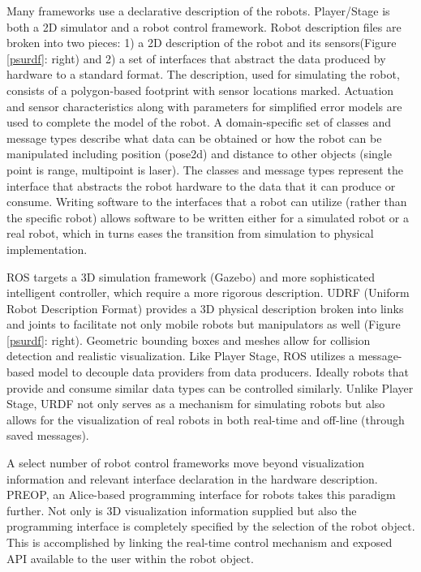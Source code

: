 Many frameworks use a declarative description of the robots.  Player/Stage \cite{vaughan2007} is both a 2D simulator and a robot control framework.  Robot description files are broken into two pieces: 1) a 2D description of the robot and its sensors(Figure \ref{psurdf}: right) and 2) a set of interfaces that abstract the data produced by hardware to a standard format.  The description, used for simulating the robot, consists of a polygon-based footprint with sensor locations marked. Actuation and sensor characteristics along with parameters for simplified error models are used to complete the model of the robot.  A domain-specific set of classes and message types describe what data can be obtained or how the robot can be manipulated including position (pose2d) and distance to other objects (single point is range, multipoint is laser).  The classes and message types represent the interface that abstracts the robot hardware to the data that it can produce or consume.  Writing software to the interfaces that a robot can utilize (rather than the specific robot) allows software to be written either for a simulated robot or a real robot, which in turns eases the transition from simulation to physical implementation.

ROS \cite{quigley2009} targets a 3D simulation framework (Gazebo) and more sophisticated intelligent controller, which require a more rigorous description.  UDRF (Uniform Robot Description Format) provides a 3D physical description broken into links and joints to facilitate not only mobile robots but manipulators as well (Figure \ref{psurdf}: right).  Geometric bounding boxes and meshes allow for collision detection and realistic visualization.  Like Player Stage, ROS utilizes a message-based model to decouple data providers from data producers.  Ideally robots that provide and consume similar data types can be controlled similarly.  Unlike Player Stage, URDF not only serves as a mechanism for simulating robots but also allows for the visualization of real robots in both real-time and off-line (through saved messages). 

A select number of robot control frameworks move beyond visualization information and relevant interface declaration in the hardware description.  PREOP, an Alice-based programming interface \cite{cooper2000,wellman2009,anderson2011} for robots takes this paradigm further.  Not only is 3D visualization information supplied but also the programming interface is completely specified by the selection of the robot object.  This is accomplished by linking the real-time control mechanism and exposed API available to the user within the robot object.  

